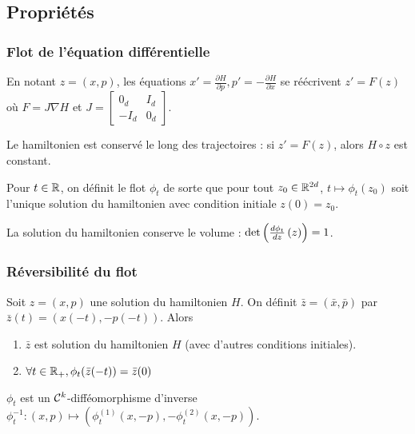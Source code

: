\documentclass[10pt]{beamer}
\begin{document}
\subsection{Propriétés}

\begin{frame}
	\frametitle{Flot de l'équation différentielle}
	En notant $z = (x,p)$, les équations $x' = \frac{\partial H}{\partial p}, p' = -\frac{\partial H}{\partial x}$ se réécrivent $z' = F(z)$ où $F = J \nabla H$ et
	$J = \begin{bmatrix}
		0_{d} & I_{d} \\
		-I_{d} & 0_{d}
	\end{bmatrix}$.
	\begin{Prop}
		Le hamiltonien est conservé le long des trajectoires : si $z' = F(z)$, alors $H \circ z$ est constant.
	\end{Prop}
	\begin{Def}
		Pour $t \in \mathbb{R}$, on définit le flot $\phi_t$ de sorte que pour tout $z_0 \in \mathbb{R}^{2d}$, $t \mapsto \phi_t(z_0)$ soit l'unique solution du hamiltonien avec condition initiale $z(0) = z_0$.
	\end{Def}
	\begin{Prop}
		La solution du hamiltonien conserve le volume : $\det \left( \frac{d \phi_t}{d z} \left( z \right) \right) = 1$.
	\end{Prop}
\end{frame}

\begin{frame}
	\frametitle{Réversibilité du flot}
	\begin{Lem}
		Soit $z = (x,p)$ une solution du hamiltonien $H$. On définit $\bar{z} = (\bar x, \bar p)$ par $\bar z(t) = (x(-t), -p(-t))$. Alors
		\begin{enumerate}
			\item $\bar{z}$ est solution du hamiltonien $H$ (avec d'autres conditions initiales).
			\item $\forall t \in \mathbb{R}_+, \phi_t(\bar{z}(-t)) = \bar{z}(0)$
		\end{enumerate}
	\end{Lem}
	\begin{Prop}
		$\phi_t$ est un $\mathcal{C}^k$-difféomorphisme d'inverse $\phi_t^{-1} : (x,p) \mapsto (\phi_t^{(1)}(x, -p), - \phi_t^{(2)}(x, -p))$.
	\end{Prop}
\end{frame}
\end{document}
